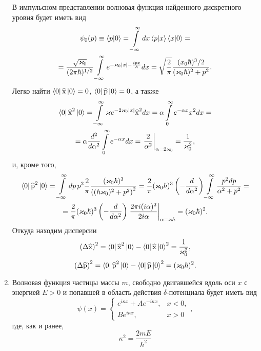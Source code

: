\documentclass[a4paper]{article}
\begin{document}
\begin{sol}
\begin{enumerate}
В импульсном представлении волновая функция найденного дискретного
уровня будет иметь вид
\begin{multline*}
	\psi_0(p)\equiv \braket{p|0}= \int\limits_{-\infty}^{\infty} 
	dx \braket{p|x}
	\braket{x|0}=\\=
	\frac{\sqrt{\varkappa_0} }{(2\pi \hbar)^{1 /2}}
	\int\limits_{-\infty}^{\infty} 
	e^{-\varkappa_0 |x|- \frac{i p x}{\hbar}}dx=
	\sqrt{\frac{2}{\pi}} \frac{(x_0 \hbar)^3 /2}{(\varkappa_0
	\hbar)^2+p^2}
.\end{multline*}
Легко найти $\bra{0}\widehat{\operatorname{x}}\ket{0}=0$,
$\bra{0}\widehat{\operatorname{p}}\ket{0}=0$, а также
\begin{multline*}
\bra{0}\widehat{\operatorname{x}}^2\ket{0}
=\int\limits_{-\infty}^{\infty} \varkappa e^{-2 \varkappa_0 |x|}
\widehat{\operatorname{x}}^2 dx= \alpha \int\limits_{0}^{\infty}
e^{-\alpha x}x^2dx=\\= \alpha \frac{d^2}{d\alpha^2}
\int\limits_{0}^{\infty} e^{-\alpha x}dx= \left. 
	\frac{2}{\alpha^2}\right|_{\alpha=2\varkappa_0}=\frac{1}{
	\varkappa_0^2} 
,\end{multline*} 
и, кроме того,
\begin{multline*}
\bra{0}\widehat{\operatorname{p}}^2\ket{0}=
\int\limits_{-\infty}^{\infty} dp \, p^2 \frac{2}{\pi}
\frac{(\varkappa_0\hbar)^3}{\left( (\hbar\varkappa_0)^2+p^2 \right) ^2}=
\frac{2}{\pi} (\varkappa_0 \hbar)^3 \left( - \frac{d}{d\alpha^2} \right) \int\limits_{-\infty}^{\infty} \frac{p^2 dp}{\alpha^2+p^2}=
\\=\frac{2}{\pi} (\varkappa_0 \hbar)^3 \left( -\frac{d}{d\alpha^2} \right) \left. \frac{2\pi i (i\alpha)^2}{2i \alpha} \right|_{\alpha
	=\varkappa\hbar}=(\varkappa_0\hbar)^2
.\end{multline*} 
Откуда находим дисперсии
\[
	\left(\Delta \widehat{\operatorname{x}}\right)^2=
	\bra{0}\widehat{\operatorname{x}}^2\ket{0}-
	\bra{0}\widehat{\operatorname{x}}\ket{0}^2=
	\frac{1}{\varkappa_0^2}
 ,\] 
\[
	\left(\Delta \widehat{\operatorname{p}}\right)^2=
	\bra{0}\widehat{\operatorname{p}}^2\ket{0}-
	\bra{0}\widehat{\operatorname{p}}\ket{0}^2=
	(\varkappa_0 \hbar)^2
.\] 
\item Волновая функция частицы массы $m$, свободно двигавшейся вдоль оси $x$ с энергией $E>0$ и попавшей в область действия $\delta$-потенциала будет иметь вид
\[
	\psi(x)= \begin{cases}
		e^{i\kappa x}+A e^{-i\kappa x},& x<0,\\
		Be^{i \kappa x},& x>0
	\end{cases}
,\]
где, как и ранее,
\[
\kappa^2=\frac{2m E}{\hbar^2}
\]
\end{enumerate}
\end{sol}
\end{document}

